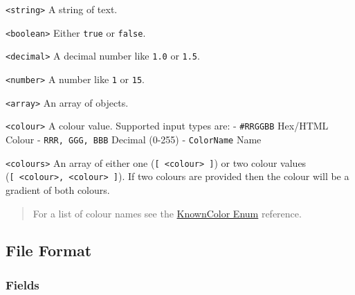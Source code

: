 \documentclass[
]{book}
\begin{document}
\texttt{\textless{}string\textgreater{}} A string of text.

\texttt{\textless{}boolean\textgreater{}} Either \texttt{true} or \texttt{false}.

\texttt{\textless{}decimal\textgreater{}} A decimal number like \texttt{1.0} or \texttt{1.5}.

\texttt{\textless{}number\textgreater{}} A number like \texttt{1} or \texttt{15}.

\texttt{\textless{}array\textgreater{}} An array of objects.

\texttt{\textless{}colour\textgreater{}} A colour value.
Supported input types are:
- \texttt{\textquotesingle{}\#RRGGBB\textquotesingle{}} Hex/HTML Colour
- \texttt{RRR,\ GGG,\ BBB} Decimal (0-255)
- \texttt{ColorName} Name

\texttt{\textless{}colours\textgreater{}} An array of either one (\texttt{{[}\ \textless{}colour\textgreater{}\ {]}}) or two colour values (\texttt{{[}\ \textless{}colour\textgreater{},\ \textless{}colour\textgreater{}\ {]}}).
If two colours are provided then the colour will be a gradient of both colours.

\begin{quote}
For a list of colour names see the \href{https://docs.microsoft.com/en-us/dotnet/api/system.drawing.knowncolor?view=netcore-3.1}{KnownColor Enum} reference.
\end{quote}

\hypertarget{file-format}{%
\subsection{File Format}\label{file-format}}

\hypertarget{fields}{%
\subsubsection{Fields}\label{fields}}
\end{document}

